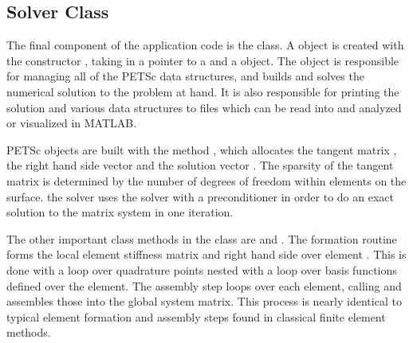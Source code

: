 \documentclass[./FinalReport.tex]{subfiles}
\begin{document}
\subsection{Solver Class}
The final component of the application code is the  class. A  object is created with the constructor , taking in a pointer to a  and a  object. The  object is responsible for managing all of the PETSc data structures, and builds and solves the numerical solution to the problem at hand. It is also responsible for printing the solution and various data structures to files which can be read into and analyzed or visualized in MATLAB. 

PETSc objects are built with the method , which allocates the tangent matrix , the right hand side vector  and the solution vector . The sparsity of the tangent matrix is determined by the number of degrees of freedom within elements on the surface. the solver uses the  solver with a  preconditioner in order to do an exact solution to the matrix system in one iteration. 

The other important class methods in the  class are  and . The formation routine forms the local element stiffness matrix and right hand side over element . This is done with a loop over quadrature points nested with a loop over basis functions defined over the element. The assembly step loops over each element, calling  and assembles those into the global system matrix. This process is nearly identical to typical element formation and assembly steps found in classical finite element methods. 
\end{document}
